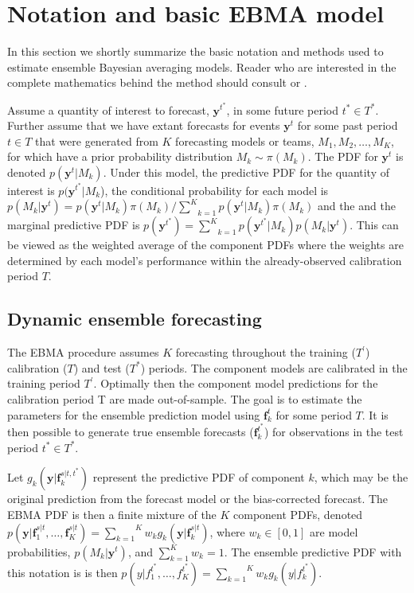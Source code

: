 \documentclass[12pt,fullpage,endnotes]{article}
\begin{document}
\section{Notation and basic EBMA model} 
\label{model}
In this section we shortly summarize the basic notation and methods used to estimate ensemble Bayesian averaging models. Reader who are interested in the complete mathematics behind the method should consult \citet{mhw:2012} or \citet{Raftery:2005}.

Assume a quantity of interest to forecast, $\mathbf{y}^{t^*}$, in some
future period $t^\ast \in T^\ast$.  Further assume that we have extant
forecasts for events $\mathbf{y}^t$ for some past period $t \in T$
that were generated from $K$ forecasting models or teams, $M_1, M_2,
\ldots, M_K$, for which have a prior probability distribution $M_k\sim
\pi(M_k)$. The PDF for $\mathbf{y}^t$ is denoted
$p(\mathbf{y}^t|M_k)$.  Under this model, the predictive PDF for the
quantity of interest is $p(\mathbf{y}^{t^*}|M_k$), the conditional
probability for each model is $p(M_k|\mathbf{y}^t) =
p(\mathbf{y}^t|M_k)\pi(M_k)/\underset{k=1}{\overset{K}{\sum}}p(\mathbf{y}^t|M_k)\pi(M_k)$
and the and the marginal predictive PDF is $p(\mathbf{y}^{t^*}) =
\underset{k=1}{\overset{K}{\sum}}
p(\mathbf{y}^{t^*}|M_k)p(M_k|\mathbf{y}^{t})$.  This can be viewed as
the weighted average of the component PDFs where the weights are
determined by each model's performance within the already-observed calibration
period $T$.

\subsection{Dynamic ensemble forecasting}

The EBMA procedure assumes $K$ forecasting throughout the training
($T^{\prime}$) calibration ($T$) and test ($T^\ast$) periods. The component models are calibrated in the training period $T^\prime$. Optimally then the component model predictions for the calibration period T are made out-of-sample. The goal is
to estimate the parameters for the ensemble prediction model using
$\mathbf{f}^{t}_k$ for some period $T$.  It is then possible to
generate true ensemble forecasts ($\mathbf{f}_k^{t^\ast}$) for
observations in the test period $t^\ast \in T^*$.

Let $g_k(\mathbf{y}|\mathbf{f}_k^{s|t, t^\ast})$ represent the
predictive PDF of component $k$, which may be the original prediction
from the forecast model or the bias-corrected forecast.  The EBMA PDF
is then a finite mixture of the $K$ component PDFs, denoted
$p(\mathbf{y}|\mathbf{f}_1^{s|t}, \ldots,
\mathbf{f}_K^{s|t})=\overset{K}{\underset{k=1}{\sum}} w_k
g_k(\mathbf{y}|\mathbf{f}_k^{s|t})$, where $w_k \in [0,1]$ are model
probabilities, $p(M_k|\mathbf{y}^t)$, and $\sum_{k=1}^Kw_k=1$. The
ensemble predictive PDF with this notation is is then
$p(y|f_{1}^{t^\ast}, \ldots,
f_{K}^{t^\ast})=\overset{K}{\underset{k=1}{\sum}} w_k
g_k(y|f_{k}^{t^*})$.
\end{document}
